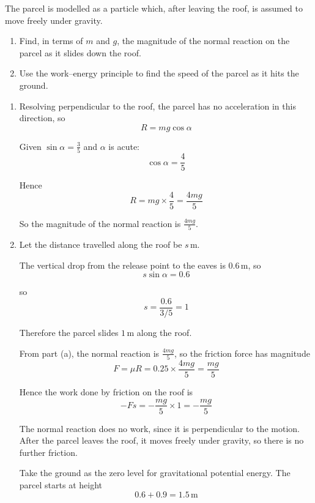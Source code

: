 \documentclass[leqno]{article}
\begin{document}
\begin{enumerate}[
  label=\textbf{\arabic*.},
  leftmargin=*,
  topsep=0pt,
  partopsep=0pt,
  parsep=0pt
]
The parcel is modelled as a particle which, after leaving the roof, is assumed to move freely under gravity. \\

\begin{enumerate}[label=\textbf{(\alph*)}]
  \item Find, in terms of $m$ and $g$, the magnitude of the normal reaction on the parcel as it slides down the roof.  \\
  \item Use the work--energy principle to find the speed of the parcel as it hits the ground.  \\
\end{enumerate}

\vspace*{10pt}

\begin{djsSolution}
\begin{enumerate}[label=\textbf{(\alph*)}]
  \item Resolving perpendicular to the roof, the parcel has no acceleration in this direction, so
  \[
  R = mg\cos\alpha
  \]
  
  Given \(\sin\alpha=\frac35\) and \(\alpha\) is acute:
  \[
  \cos\alpha=\frac45
  \]
  
  Hence
  \[
  R=mg\times\frac45=\frac{4mg}{5}
  \]
  
  So the magnitude of the normal reaction is \(\frac{4mg}{5}\).

  \item Let the distance travelled along the roof be \(s\,\mathrm{m}\).

  The vertical drop from the release point to the eaves is \(0.6\,\mathrm{m}\), so
  \[
  s\sin\alpha=0.6
  \]

  so
  \[
  s=\frac{0.6}{3/5}=1
  \]
  
  Therefore the parcel slides \(1\,\mathrm{m}\) along the roof.

  From part (a), the normal reaction is \(\frac{4mg}{5}\), so the friction force has magnitude
  \[
  F=\mu R=0.25\times \frac{4mg}{5}=\frac{mg}{5}
  \]
  
  Hence the work done by friction on the roof is
  \[
  -Fs=-\frac{mg}{5}\times 1=-\frac{mg}{5}
  \]
  
  The normal reaction does no work, since it is perpendicular to the motion. After the parcel leaves the roof, it moves freely under gravity, so there is no further friction.

  Take the ground as the zero level for gravitational potential energy. The parcel starts at height
  \[
  0.6+0.9=1.5\,\mathrm{m}
  \]


\end{enumerate}
\end{djsSolution}
\end{enumerate}
\end{document}
